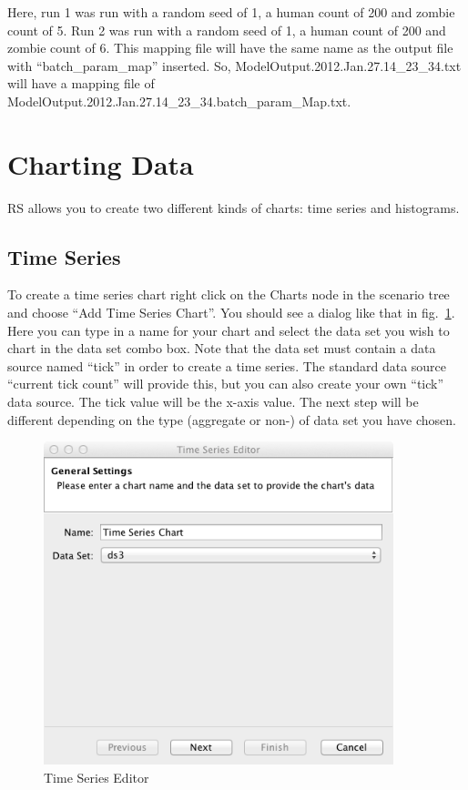 \documentclass[11pt]{amsart}
\begin{document}
Here, run 1 was run with a random seed of 1, a human count of 200 and zombie count of 5. Run 2 was run with a random seed of 1, a human count of 200 and zombie count of 6. This mapping file will have the same name as the output file with ``batch\_param\_map'' inserted. So, ModelOutput.2012.Jan.27.14\_23\_34.txt will have a mapping file of ModelOutput.2012.Jan.27.14\_23\_34.batch\_param\_Map.txt.

\section{Charting Data}
RS allows you to create two different kinds of charts: time series and histograms. 

\subsection{Time Series}
To create a time series chart right click on the Charts node in the scenario tree and choose ``Add Time Series Chart''. You should see a dialog like that in fig.~\ref{fig:ts1}. Here you can type in a name for your chart and select the data set you wish to chart in the data set combo box. Note that the data set must contain a data source named ``tick'' in order to create a time series. The standard data source ``current tick count'' will provide this, but you can also create your own ``tick'' data source. The tick value will be the x-axis value. The next step will be different depending on the type (aggregate or non-) of data set you have chosen. 

\begin{figure}[h]
\begin{center}
\vspace{.2in}
\centerline {
\includegraphics[width=4in]{images/ts1.png}
}
\caption{Time Series Editor}
\label{fig:ts1}
\end{center}
\end{figure}
\end{document}
